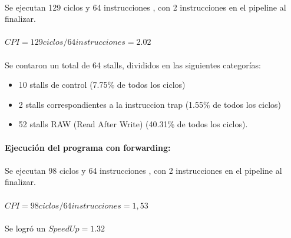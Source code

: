 \documentclass[a4paper,11pt]{article}
\begin{document}
\begin{enumerate}
\paragraph{}
Se ejecutan 129 ciclos y 64 instrucciones , con 2 instrucciones en el  pipeline al finalizar.

\paragraph{}
\begin{center}
$CPI = 129 ciclos / 64 instrucciones = 2.02$
\end{center}

\paragraph{}

Se contaron un total de 64 stalls, divididos en las siguientes categor\'ias:

\begin{itemize}
\item 10 stalls de control (7.75\% de todos los ciclos)
\item 2  stalls correspondientes a la instruccion trap (1.55\% de todos los ciclos)
\item 52 stalls RAW (Read After Write) (40.31\% de todos los ciclos).
\end{itemize}

\paragraph{Ejecuci\'on del programa con forwarding:}


\paragraph{}
Se ejecutan 98 ciclos y 64 instrucciones , con 2 instrucciones en el  pipeline al finalizar.

\paragraph{}
\begin{center}
$CPI = 98 ciclos / 64 instrucciones = 1,53$
\end{center}

\paragraph{}
Se logr\'o un $SpeedUp = 1.32$


\end{enumerate}
\end{document}
